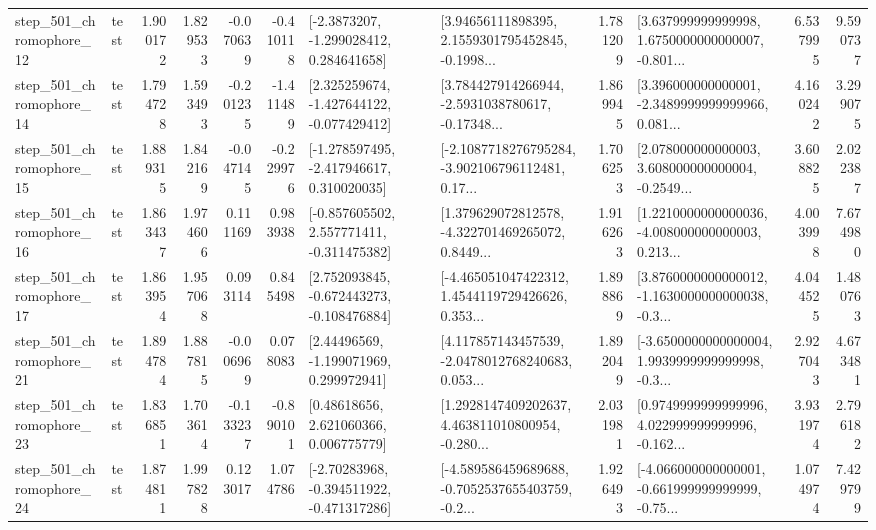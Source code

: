 \begin{tabular}{llrrrrllrlrr}
  step\_501\_chromophore\_12 &      test &      1.900172 &    1.829533 &     -0.070639 & -0.410118 &     [-2.3873207, -1.299028412, 0.284641658] &  [3.94656111898395, 2.1559301795452845, -0.1998... &       1.781209 &  [3.637999999999998, 1.6750000000000007, -0.801... &            6.537995 &          9.590737 \\
  step\_501\_chromophore\_14 &      test &      1.794728 &    1.593493 &     -0.201235 & -1.411489 &   [2.325259674, -1.427644122, -0.077429412] &  [3.784427914266944, -2.5931038780617, -0.17348... &       1.869945 &  [3.396000000000001, -2.3489999999999966, 0.081... &            4.160242 &          3.299075 \\
  step\_501\_chromophore\_15 &      test &      1.889315 &    1.842169 &     -0.047145 & -0.229976 &   [-1.278597495, -2.417946617, 0.310020035] &  [-2.1087718276795284, -3.902106796112481, 0.17... &       1.706253 &  [2.078000000000003, 3.608000000000004, -0.2549... &            3.608825 &          2.022387 \\
  step\_501\_chromophore\_16 &      test &      1.863437 &    1.974606 &      0.111169 &  0.983938 &   [-0.857605502, 2.557771411, -0.311475382] &  [1.379629072812578, -4.322701469265072, 0.8449... &       1.916263 &  [1.2210000000000036, -4.008000000000003, 0.213... &            4.003998 &          7.674980 \\
  step\_501\_chromophore\_17 &      test &      1.863954 &    1.957068 &      0.093114 &  0.845498 &   [2.752093845, -0.672443273, -0.108476884] &  [-4.465051047422312, 1.4544119729426626, 0.353... &       1.898869 &  [3.8760000000000012, -1.1630000000000038, -0.3... &            4.044525 &          1.480763 \\
  step\_501\_chromophore\_21 &      test &      1.894784 &    1.887815 &     -0.006969 &  0.078083 &     [2.44496569, -1.199071969, 0.299972941] &  [4.117857143457539, -2.0478012768240683, 0.053... &       1.892049 &  [-3.6500000000000004, 1.9939999999999998, -0.3... &            2.927043 &          4.673481 \\
  step\_501\_chromophore\_23 &      test &      1.836851 &    1.703614 &     -0.133237 & -0.890101 &      [0.48618656, 2.621060366, 0.006775779] &  [1.2928147409202637, 4.463811010800954, -0.280... &       2.031981 &  [0.9749999999999996, 4.022999999999996, -0.162... &            3.931974 &          2.796182 \\
  step\_501\_chromophore\_24 &      test &      1.874811 &    1.997828 &      0.123017 &  1.074786 &   [-2.70283968, -0.394511922, -0.471317286] &  [-4.589586459689688, -0.7052537655403759, -0.2... &       1.926493 &  [-4.066000000000001, -0.661999999999999, -0.75... &            1.074974 &          7.429799 \\

\end{tabular}
